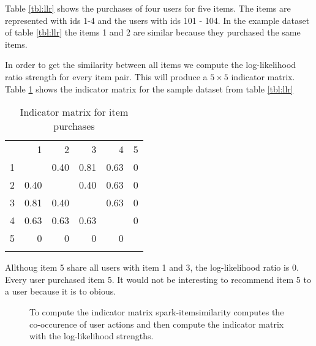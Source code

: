 Table \ref{tbl:llr} shows the purchases of four users for five items. The items are represented with ids 1-4 and the users with ids 101 - 104.
In the example dataset of table \ref{tbl:llr} the items 1 and 2 are similar because they purchased the same items. 

In order to get the similarity between all items we compute the log-likelihood ratio strength for every item pair. This will produce a $5 \times 5$ indicator matrix. Table \ref{tab:indicatormatrix} shows the indicator matrix for the sample dataset from table \ref{tbl:llr}

\begin{table}
  \centering
\begin{center}
\begin{tabular}{rrrrrr}
 & 1 & 2 & 3 & 4 & 5\\
1 &  & 0.40 & 0.81 & 0.63 & 0\\
2 & 0.40 &  & 0.40 & 0.63 & 0\\
3 & 0.81 & 0.40 &  & 0.63 & 0\\
4 & 0.63 & 0.63 & 0.63 &  & 0\\
5 & 0 & 0 & 0 & 0 & \\
 &  &  &  &  & \\
\end{tabular}
\end{center}
  \caption{Indicator matrix for item purchases}
  \label{tab:indicatormatrix}
\end{table}


Allthoug item 5 share all users with item 1 and 3, the log-likelihood ratio is 0. Every user purchased item 5. It would not be interesting to recommend item 5 to a user because it is to obious.

\begin{figure}
\centering
{}
\caption{To compute the indicator matrix {\ttfamily spark-itemsimilarity} computes the co-occurence  of user actions and then compute the indicator matrix with the log-likelihood strengths.}
\end{figure}

